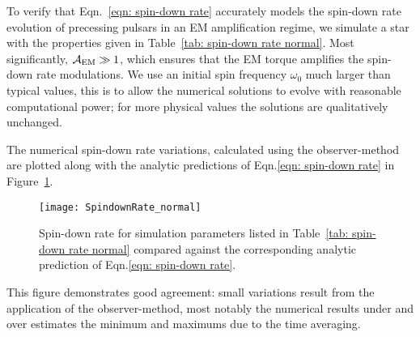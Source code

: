 \documentclass[../full_thesis/full_thesis.tex]{subfiles}
\newcommand{\thisdir}{../inertial_frame}
\begin{document}
To verify that Eqn.~\eqref{eqn: spin-down rate} accurately models the spin-down
rate evolution of precessing pulsars in an EM amplification regime, we simulate
a star with the properties given in Table~\ref{tab: spin-down rate normal}.
Most significantly, $\mathcal{A}_{\mathrm{EM}} \gg 1$, which ensures that the EM torque amplifies
the spin-down rate modulations. We use an initial spin frequency $\omega_0$
much larger than typical values, this is to allow the numerical solutions to
evolve with reasonable computational power; for more physical values the
solutions are qualitatively unchanged.
\begin{table}[htb]
\centering

\caption{Simulation parameters for the spin-down rate plotted in
Figure~\ref{fig: spin-down rate normal}.}
\label{tab: spin-down rate normal}
\end{table}

The numerical spin-down rate variations, calculated using the observer-method
are plotted along with the analytic predictions of Eqn.\eqref{eqn: spin-down rate}
in Figure~\ref{fig: spin-down rate normal}.
\begin{figure}[htb]
\centering
\texttt{[image: SpindownRate\_normal]}
\caption{Spin-down rate for simulation parameters listed in Table~\ref{tab:
spin-down rate normal} compared against the corresponding analytic prediction
of Eqn.\eqref{eqn: spin-down rate}.}
\label{fig: spin-down rate normal}
\end{figure}
This figure demonstrates good agreement: small variations result from the
application of the observer-method, most notably the numerical results under
and over estimates the minimum and maximums due to the time averaging.
\end{document}
